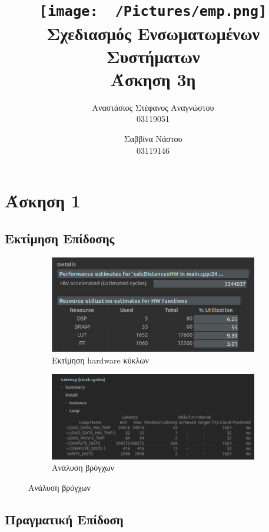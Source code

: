 \documentclass{article}
\title{
    \texttt{[image: ~/Pictures/emp.png]} \\
    \vskip 5cm
    Σχεδιασμός Ενσωματωμένων Συστήματων \\
    \large Άσκηση 3η
    \vskip 5cm
}
\author{
    Αναστάσιος Στέφανος Αναγνώστου \\ \large 03119051 \and
    Σαββίνα Νάστου \\ \large 03119146
}
\newcommand{\eng}[1]{\foreignlanguage{english}{#1}} %
\begin{document}
\maketitle \clearpage \tableofcontents \clearpage

\section*{Άσκηση 1}

\subsection*{Εκτίμηση Επίδοσης}

\begin{figure}[ht]
    \centering
    \begin{subfigure}{0.8\textwidth}
        \includegraphics[width=\textwidth]{../photos/initial/cycles.png}
        \caption{Εκτίμηση \eng{hardware} κύκλων}
    \end{subfigure}
    \begin{subfigure}{0.8\textwidth}
        \includegraphics[width=\textwidth]{../photos/initial/loops.png}
        \caption{Ανάλυση βρόγχων}
    \end{subfigure}
\end{figure}

\subsection*{Πραγματική Επίδοση}
\end{document}
